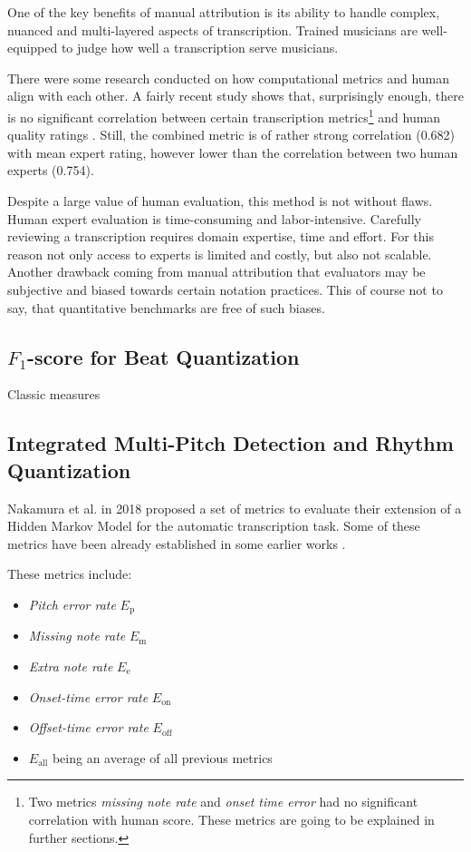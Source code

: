 One of the key benefits of manual attribution is its ability to handle complex, nuanced and multi-layered aspects of transcription. Trained musicians are well-equipped to judge how well a transcription serve musicians.

There were some research conducted on how computational metrics and human align with each other. A fairly recent study shows that, surprisingly enough, there is no significant correlation between certain transcription metrics\footnote{Two metrics \emph{missing note rate} and \emph{onset time error} had no significant correlation with human score. These metrics are going to be explained in further sections.} and human quality ratings \cite{Holzapfel2021}. Still, the combined metric is of rather strong correlation (0.682) with mean expert rating, however lower than the correlation between two human experts (0.754).

Despite a large value of human evaluation, this method is not without flaws. Human expert evaluation is time-consuming and labor-intensive. Carefully reviewing a transcription requires domain expertise, time and effort. For this reason not only access to experts is limited and costly, but also not scalable. Another drawback coming from manual attribution that evaluators may be subjective and biased towards certain notation practices. This of course not to say, that quantitative benchmarks are free of such biases.

\subsection{$F_1$-score for Beat Quantization}

Classic measures

\subsection{Integrated Multi-Pitch Detection and Rhythm Quantization}

Nakamura et al. in 2018 proposed a set of metrics to evaluate their extension of a Hidden Markov Model \cite{Nakamura2018} for the automatic transcription task. Some of these metrics have been already established in some earlier works \cite{Nakamura2017}.

These metrics include: \begin{itemize}
	\item \emph{Pitch error rate} $E_{\textrm{p}}$
	\item \emph{Missing note rate} $E_{\textrm{m}}$
	\item \emph{Extra note rate} $E_{\textrm{e}}$
	\item \emph{Onset-time error rate} $E_{\textrm{on}}$
	\item \emph{Offset-time error rate} $E_{\textrm{off}}$
	\item $E_{\textrm{all}}$ being an average of all previous metrics
\end{itemize}


